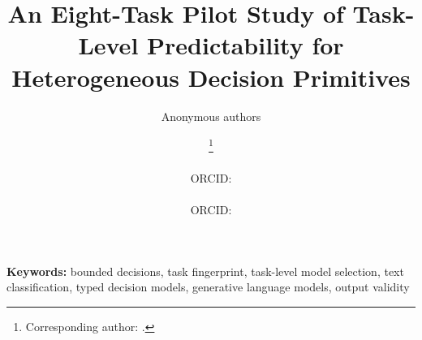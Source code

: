 \documentclass{article}
\title{An Eight-Task Pilot Study of Task-Level Predictability for Heterogeneous Decision Primitives}
\author{Anonymous authors}
\author{%
    \authoronename\thanks{Corresponding author: \href{mailto:sudip.785421@memc.tu.edu.np}{\authoroneemail}.} \\
    \authoroneaffil \\
    ORCID: \href{https://orcid.org/0009-0009-8886-114X}{\authoroneorcid}
    \And
    \authortwoname \\
    \authortwoaffil \\
    ORCID: \href{https://orcid.org/0009-0000-9454-7012}{\authortwoorcid}
  }
\begin{document}
\maketitle

\begin{abstract}

\end{abstract}

\noindent\textbf{Keywords:} bounded decisions, task fingerprint, task-level model selection, text classification, typed decision models, generative language models, output validity












\FloatBarrier


\end{document}
